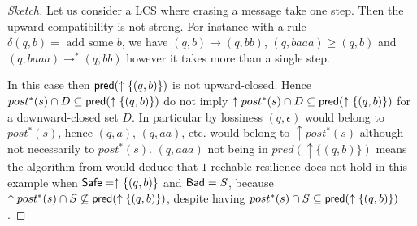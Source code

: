 \begin{proof}[Sketch]
Let us consider a LCS where erasing a message take one step. Then the upward compatibility is not strong. 
For instance with a rule $\delta(q,b) = \text{ add some }b $,
we have $(q,b) \to (q,bb)$, $(q, baaa) \geq (q,b)$ and
$(q, baaa) \to^* (q,bb)$ however it takes more than a single step.

In this case then $\textsf{pred}(\uparrow \{(q,b)\})$ is not upward-closed. Hence 
$post^* (s) \cap D \subseteq \textsf{pred}(\uparrow \{(q,b)\})$
do not imply
$\uparrow post^* (s) \cap D \subseteq \textsf{pred}(\uparrow \{(q,b)\})$ for a downward-closed set $D$.
In particular by lossiness $(q, \epsilon)$ would belong to
$post^* (s)$,
hence $(q,a)$, $(q,aa)$, etc. would belong to $\uparrow post^* (s)$ although not necessarily to
$post^* (s)$. $(q,aaa)$ not being in $pred(\uparrow \{ (q,b)\})$ means the algorithm 
from \cite{DBLP:conf/gg/Ozkan22} would deduce that $1$-rechable-resilience does not hold in this example when $\textsf{Safe}=\uparrow \{(q,b)\}$ and $\textsf{Bad} =S$,
because $\uparrow post^* (s) \cap S \not\subseteq \textsf{pred}(\uparrow \{(q,b)\})$,
despite having 
$post^* (s) \cap S \subseteq \textsf{pred}(\uparrow \{(q,b)\})$.

\iffalse
{}
\end{proof}
